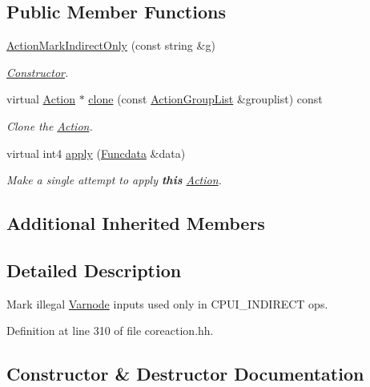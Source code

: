 \subsection*{Public Member Functions}
\begin{DoxyCompactItemize}
\item 
\mbox{\hyperlink{class_action_mark_indirect_only_ab230cdfb530a3ef8f1c4ff4ad4c3fc9f}{Action\+Mark\+Indirect\+Only}} (const string \&g)
\begin{DoxyCompactList}\small\item\em \mbox{\hyperlink{class_constructor}{Constructor}}. \end{DoxyCompactList}\item 
virtual \mbox{\hyperlink{class_action}{Action}} $\ast$ \mbox{\hyperlink{class_action_mark_indirect_only_ac53f9107d3a9c5be4576867c9eb8ad01}{clone}} (const \mbox{\hyperlink{class_action_group_list}{Action\+Group\+List}} \&grouplist) const
\begin{DoxyCompactList}\small\item\em Clone the \mbox{\hyperlink{class_action}{Action}}. \end{DoxyCompactList}\item 
virtual int4 \mbox{\hyperlink{class_action_mark_indirect_only_aebf60dbaf803f470c8954cab93acc241}{apply}} (\mbox{\hyperlink{class_funcdata}{Funcdata}} \&data)
\begin{DoxyCompactList}\small\item\em Make a single attempt to apply {\bfseries{this}} \mbox{\hyperlink{class_action}{Action}}. \end{DoxyCompactList}\end{DoxyCompactItemize}
\subsection*{Additional Inherited Members}


\subsection{Detailed Description}
Mark illegal \mbox{\hyperlink{class_varnode}{Varnode}} inputs used only in C\+P\+U\+I\+\_\+\+I\+N\+D\+I\+R\+E\+CT ops. 

Definition at line 310 of file coreaction.\+hh.



\subsection{Constructor \& Destructor Documentation}
\mbox{\label{class_action_mark_indirect_only_ab230cdfb530a3ef8f1c4ff4ad4c3fc9f}} 

